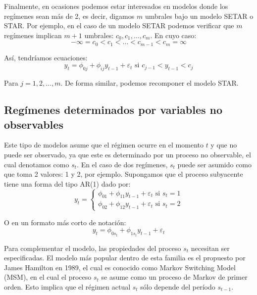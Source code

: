 \documentclass[
]{book}
\begin{document}
Finalmente, en ocasiones podemos estar interesados en modelos donde los regímenes sean más de 2, es decir, digamos \(m\) umbrales bajo un modelo SETAR o STAR. Por ejemplo, en el caso de un modelo SETAR podemos verificar que \(m\) regímenes implican \(m + 1\) umbrales: \(c_0, c_1, \ldots, c_m\). En cuyo caso:
\begin{equation*}
    -\infty = c_0 < c_1 < \ldots < c_{m-1} < c_m = \infty
\end{equation*}

Así, tendríamos ecuaciones:
\begin{equation}
    y_t = \phi_{0j} + \phi_{ij} y_{t-1} + \varepsilon_t \text{ si } c_{j-1} < y_{t-1} < c_j
\end{equation}

Para \(j = 1, 2, \ldots, m\). De forma similar, podemos recomponer el modelo STAR.

\hypertarget{reguxedmenes-determinados-por-variables-no-observables}{%
\subsection{Regímenes determinados por variables no observables}\label{reguxedmenes-determinados-por-variables-no-observables}}

Este tipo de modelos asume que el régimen ocurre en el momento \(t\) y que no puede ser observado, ya que este es determinado por un proceso no observable, el cual denotamos como \(s_t\). En el caso de dos regímenes, \(s_t\) puede ser asumido como que toma 2 valores: 1 y 2, por ejemplo. Supongamos que el proceso subyacente tiene una forma del tipo AR(1) dado por:
\begin{equation}
    y_t = 
    \begin{cases}
        \phi_{01} + \phi_{11} y_{t-1} + \varepsilon_t \text{ si } s_t = 1 \\
        \phi_{02} + \phi_{12} y_{t-1} + \varepsilon_t \text{ si } s_t = 2
    \end{cases}
    \label{eqSwchingObs}
\end{equation}

O en un formato más corto de notación:
\begin{equation}
    y_t = \phi_{0 s_t} + \phi_{1 s_t} y_{t-1} + \varepsilon_t
\end{equation}

Para complementar el modelo, las propiedades del proceso \(s_t\) necesitan ser especificadas. El modelo más popular dentro de esta familia es el propuesto por James Hamilton en 1989, el cual es conocido como Markov Switching Model (MSM), en el cual el proceso \(s_t\) se asume como un proceso de Markov de primer orden. Esto implica que el régimen actual \(s_t\) sólo depende del período \(s_{t-1}\).
\end{document}
